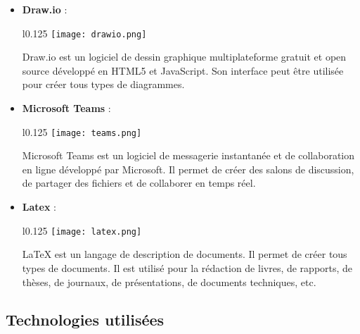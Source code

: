 \begin{itemize}
    \vspace{0.5cm}
    \item \textbf{Draw.io} :\\
    \begin{minipage}{\linewidth}
      \begin{wrapfigure}{l}{0.125\textwidth}
        \vspace{-0.5cm}
        \texttt{[image: drawio.png]} 
      \end{wrapfigure}
      Draw.io est un logiciel de dessin graphique multiplateforme gratuit et open source développé en HTML5 et JavaScript. Son interface peut être utilisée pour créer tous types de diagrammes.
    \end{minipage}

    \vspace{0.5cm}
    \item \textbf{Microsoft Teams} :\\
    \begin{minipage}{\linewidth}
      \begin{wrapfigure}{l}{0.125\textwidth}
        \vspace{-0.5cm}
        \texttt{[image: teams.png]} 
      \end{wrapfigure}
      Microsoft Teams est un logiciel de messagerie instantanée et de collaboration en ligne développé par Microsoft. Il permet de créer des salons de discussion, de partager des fichiers et de collaborer en temps réel.
    \end{minipage}

    \vspace{0.5cm}
    \item \textbf{Latex} :\\
    \begin{minipage}{\linewidth}
      \begin{wrapfigure}{l}{0.125\textwidth}
        \vspace{-0.5cm}
        \texttt{[image: latex.png]} 
      \end{wrapfigure}
      LaTeX est un langage de description de documents. Il permet de créer tous types de documents. Il est utilisé pour la rédaction de livres, de rapports, de thèses, de journaux, de présentations, de documents techniques, etc.
    \end{minipage}
  \end{itemize}


  \subsection{Technologies utilisées}

